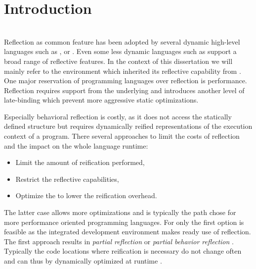 
\chapter{Introduction}
\minitoc

\\
\noindent Reflection as common feature has been adopted by several dynamic high-level languages such as ,  or .
Even some less dynamic languages such as \Java support a broad range of reflective features.
In the context of this dissertation we will mainly refer to the \PH environment which inherited its reflective capability from \ST.
One major reservation of programming languages over reflection is performance.
Reflection requires support from the underlying \VM and introduces another level of late-binding which prevent more aggressive static optimizations.


Especially behavioral reflection is costly, as it does not access the statically defined structure but requires dynamically reified representations of the execution context of a program.
There several approaches to limit the costs of reflection and the impact on the whole language runtime:
\begin{itemize}[nolistsep]
	\item Limit the amount of reification performed,
	\item Restrict the reflective capabilities,
	\item Optimize the \VM to lower the reification overhead.
\end{itemize}
The latter case allows more optimizations and is typically the path chose for more performance oriented programming languages.
For \PH only the first option is feasible as the integrated development environment makes ready use of reflection.
The first approach results in \emph{partial reflection} or \emph{partial behavior reflection} \cite{Tant03a}.
Typically the code locations where reification is necessary do not change often and can thus by dynamically optimized at runtime \cite{Roet07b}.

